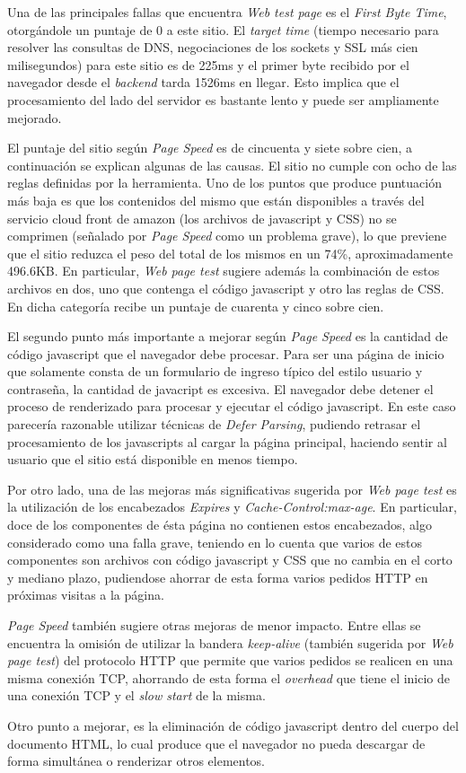Una de las principales fallas que encuentra \emph{Web test page} es el \emph{First Byte Time}, otorgándole un puntaje de 0 a este sitio. El \emph{target time} (tiempo
necesario para resolver las consultas de DNS, negociaciones de los sockets y SSL más cien milisegundos) para este sitio es de 225ms y el primer byte recibido por el navegador
desde el \emph{backend} tarda 1526ms en llegar. Esto implica que el procesamiento del lado del servidor es bastante lento y puede ser ampliamente mejorado.

El puntaje del sitio según \emph{Page Speed} es de cincuenta y siete sobre cien, a continuación se explican algunas de las causas. El sitio no cumple con ocho de las reglas definidas por la herramienta. Uno de los puntos que produce puntuación más baja es que los contenidos del mismo que están disponibles a través del servicio cloud front de amazon (los
archivos de javascript y CSS) no se comprimen (señalado por \emph{Page Speed} como un problema grave), lo que previene que el sitio reduzca el peso del total de los mismos en un
74\%, aproximadamente 496.6KB. En particular, \emph{Web page test} sugiere además la combinación de estos archivos en dos, uno que contenga el código
javascript y otro las reglas de CSS. En dicha categoría recibe un puntaje de cuarenta y cinco sobre cien.

El segundo punto más importante a mejorar según \emph{Page Speed} es la cantidad de código javascript que el navegador debe procesar. Para ser una página de inicio que solamente
consta de un formulario de ingreso típico del estilo usuario y contraseña, la cantidad de javacript es excesiva. El navegador debe detener el proceso de renderizado para procesar y
ejecutar el código javascript. En este caso parecería razonable utilizar técnicas de \emph{Defer Parsing}, pudiendo retrasar el procesamiento de los javascripts al cargar la página principal,
haciendo sentir al usuario que el sitio está disponible en menos tiempo.

Por otro lado, una de las mejoras más significativas sugerida por \emph{Web page test} es la utilización de los encabezados \emph{Expires} y \emph{Cache-Control:max-age}. En
particular, doce de los componentes de ésta página no contienen estos encabezados, algo considerado como una falla grave, teniendo en lo cuenta que varios de estos componentes son archivos con
código javascript y CSS que no cambia en el corto y mediano plazo, pudiendose ahorrar de esta forma varios pedidos HTTP en próximas visitas a la página.

\emph{Page Speed} también sugiere otras mejoras de menor impacto. Entre ellas se encuentra la omisión de utilizar la bandera \emph{keep-alive} (también sugerida por \emph{Web
page test}) del protocolo HTTP que permite que varios pedidos se realicen en una misma conexión TCP, ahorrando de esta forma el \emph{overhead} que tiene el inicio de una conexión TCP
y el \emph{slow start} de la misma.

Otro punto a mejorar, es la eliminación de código javascript dentro del cuerpo del documento HTML, lo cual produce que el navegador no pueda descargar de forma simultánea o
renderizar otros elementos.

